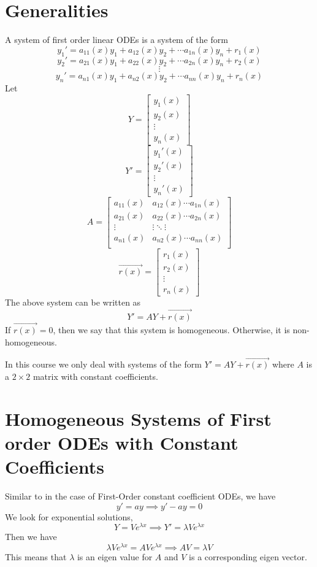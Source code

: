 \documentclass[openany]{report}
\begin{document}
\section{Generalities}
\begin{definition}
    A system of first order linear ODEs is a system of the form 
    \[y_1' = a_{11}(x)y_1 + a_{12}(x)y_2 + \cdots a_{1n}(x)y_n + r_1(x)\]
    \[y_2' = a_{21}(x)y_1 + a_{22}(x)y_2 + \cdots a_{2n}(x)y_n + r_2(x)\]
    \[\vdots\]
    \[y_n' = a_{n1}(x)y_1 + a_{n2}(x)y_2 + \cdots a_{nn}(x)y_n + r_n(x)\]
    Let 
    \[Y = \begin{bmatrix}
        y_1(x)\\
        y_2(x)\\
        \vdots\\
        y_n(x)
    \end{bmatrix}\]
    \[Y' = \begin{bmatrix}
        y_1'(x)\\
        y_2'(x)\\
        \vdots\\
        y_n'(x)
    \end{bmatrix}\]
    \[A = \begin{bmatrix}
        a_{11}(x) & a_{12}(x) \cdots a_{1n}(x)\\
        a_{21}(x) & a_{22}(x) \cdots a_{2n}(x)\\
        \vdots & \vdots \ddots \vdots\\
        a_{n1}(x) & a_{n2}(x) \cdots a_{nn}(x)\\
    \end{bmatrix}\]
    \[\vec{r(x)} = \begin{bmatrix}
        r_1(x)\\
        r_2(x)\\
        \vdots\\
        r_n(x)
    \end{bmatrix}\]
    The above system can be written as 
    \[Y' = AY + \vec{r(x)}\]
    If $\vec{r(x)} = 0$, then we say that this system is homogeneous. Otherwise, it is non-homogeneous.
\end{definition}
In this course we only deal with systems of the form $Y' = AY + \vec{r(x)}$ where $A$ is a $2\times 2$ matrix with constant coefficients. 
\section{Homogeneous Systems of First order ODEs with Constant Coefficients}
Similar to in the case of First-Order constant coefficient ODEs, we have 
\[y' = ay \implies y' - ay = 0\]
We look for exponential solutions,
\[Y = Ve^{\lambda x} \implies Y' = \lambda Ve^{\lambda x}\]
Then we have
\[\lambda V e^{\lambda x} = AV e^{\lambda x} \implies AV = \lambda V\]
This means that $\lambda$ is an eigen value for $A$ and $V$ is a corresponding eigen vector. 
\end{document}
